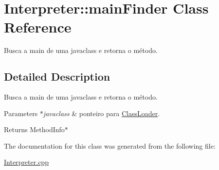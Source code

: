 \hypertarget{class_interpreter_1_1main_finder}{}\section{Interpreter\+:\+:main\+Finder Class Reference}
\label{class_interpreter_1_1main_finder}


Busca a main de uma javaclass e retorna o método.  




\subsection{Detailed Description}
Busca a main de uma javaclass e retorna o método. 


\begin{DoxyParams}{Parameters}
{\em $\ast$javaclass} & ponteiro para \hyperlink{class_class_loader}{Class\+Loader}. \\
\hline
\end{DoxyParams}
\begin{DoxyReturn}{Returns}
Method\+Info$\ast$ 
\end{DoxyReturn}


The documentation for this class was generated from the following file\+:\begin{DoxyCompactItemize}
\item 
\hyperlink{_interpreter_8cpp}{Interpreter.\+cpp}\end{DoxyCompactItemize}
